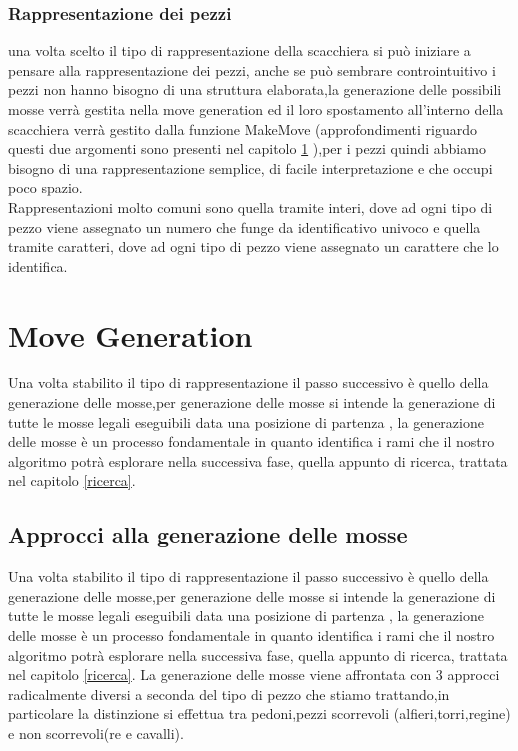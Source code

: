 \subsubsection{Rappresentazione dei pezzi}
una volta scelto il tipo di rappresentazione della scacchiera si può iniziare a pensare alla rappresentazione dei pezzi,
anche se può sembrare controintuitivo i pezzi non hanno bisogno di una struttura elaborata,la generazione delle possibili
mosse verrà gestita nella move generation ed il loro spostamento all'interno della scacchiera verrà gestito dalla funzione
MakeMove (approfondimenti riguardo questi due argomenti sono presenti nel capitolo \ref{move generation}  ),per i pezzi quindi abbiamo bisogno di una
rappresentazione semplice, di facile interpretazione e che occupi poco spazio.\\Rappresentazioni molto comuni sono quella
tramite interi, dove ad ogni tipo di pezzo viene assegnato un numero che funge da identificativo univoco e quella tramite
caratteri, dove ad ogni tipo di pezzo viene assegnato un carattere che lo identifica.


\section{Move Generation}
\label{move generation} %
%
Una volta stabilito il tipo di rappresentazione il passo successivo è quello della generazione delle mosse,per generazione delle mosse si intende la generazione
di tutte le mosse legali eseguibili data una posizione di partenza , la generazione delle mosse è un processo fondamentale in quanto identifica i rami che
il nostro algoritmo potrà esplorare nella successiva fase, quella appunto di ricerca, trattata nel capitolo \ref{ricerca}.





\subsection{Approcci alla generazione delle mosse}
Una volta stabilito il tipo di rappresentazione il passo successivo è quello della generazione delle mosse,per generazione delle mosse si intende la generazione
di tutte le mosse legali eseguibili data una posizione di partenza , la generazione delle mosse è un processo fondamentale in quanto identifica i rami che
il nostro algoritmo potrà esplorare nella successiva fase, quella appunto di ricerca, trattata nel capitolo \ref{ricerca}.
La generazione delle mosse viene affrontata con 3 approcci radicalmente diversi a seconda del tipo di pezzo che stiamo trattando,in particolare la distinzione si effettua tra 
pedoni,pezzi scorrevoli (alfieri,torri,regine) e non scorrevoli(re e cavalli).

